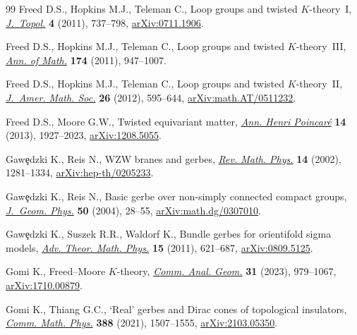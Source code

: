 \documentclass[pdftex]{sigma}
\numberwithin{equation}{section}
\begin{document}
\begin{thebibliography}{99}
Freed D.S., Hopkins M.J., Teleman C., Loop groups and twisted {$K$}-theory~{I},
 \href{https://doi.org/10.1112/jtopol/jtr019}{\textit{J.~Topol.}} \textbf{4}
 (2011), 737--798, \href{http://arxiv.org/abs/0711.1906}{arXiv:0711.1906}.

Freed D.S., Hopkins M.J., Teleman C., Loop groups and twisted
 {$K$}-theory~{III},
 \href{https://doi.org/10.4007/annals.2011.174.2.5}{\textit{Ann. of Math.}}
 \textbf{174} (2011), 947--1007.

Freed D.S., Hopkins M.J., Teleman C., Loop groups and twisted
 {$K$}-theory~{II},
 \href{https://doi.org/10.1090/s0894-0347-2013-00761-4}{\textit{J.~Amer. Math.
 Soc.}} \textbf{26} (2012), 595--644,
 \href{http://arxiv.org/abs/math.AT/0511232}{arXiv:math.AT/0511232}.

Freed D.S., Moore G.W., Twisted equivariant matter,
 \href{https://doi.org/10.1007/s00023-013-0236-x}{\textit{Ann. Henri
 Poincar\'e}} \textbf{14} (2013), 1927--2023,
 \href{http://arxiv.org/abs/1208.5055}{arXiv:1208.5055}.

Gaw\c{e}dzki K., Reis N., W{ZW} branes and gerbes,
 \href{https://doi.org/10.1142/S0129055X02001557}{\textit{Rev. Math. Phys.}}
 \textbf{14} (2002), 1281--1334,
 \href{http://arxiv.org/abs/hep-th/0205233}{arXiv:hep-th/0205233}.

Gaw\c{e}dzki K., Reis N., Basic gerbe over non-simply connected compact groups,
 \href{https://doi.org/10.1016/j.geomphys.2003.11.004}{\textit{J.~Geom.
 Phys.}} \textbf{50} (2004), 28--55,
 \href{http://arxiv.org/abs/math.dg/0307010}{arXiv:math.dg/0307010}.

Gaw\c{e}dzki K., Suszek R.R., Waldorf K., Bundle gerbes for orientifold sigma
 models, \href{https://doi.org/10.4310/atmp.2011.v15.n3.a1}{\textit{Adv.
 Theor. Math. Phys.}} \textbf{15} (2011), 621--687,
 \href{http://arxiv.org/abs/0809.5125}{arXiv:0809.5125}.

Gomi K., Freed--{M}oore {$K$}-theory,
 \href{https://doi.org/10.4310/cag.2023.v31.n4.a7}{\textit{Comm. Anal. Geom.}}
 \textbf{31} (2023), 979--1067,
 \href{http://arxiv.org/abs/1710.00879}{arXiv:1710.00879}.

Gomi K., Thiang G.C., `{R}eal' gerbes and {D}irac cones of topological
 insulators, \href{https://doi.org/10.1007/s00220-021-04238-0}{\textit{Comm.
 Math. Phys.}} \textbf{388} (2021), 1507--1555,
 \href{http://arxiv.org/abs/2103.05350}{arXiv:2103.05350}.


\end{thebibliography}
\end{document}
